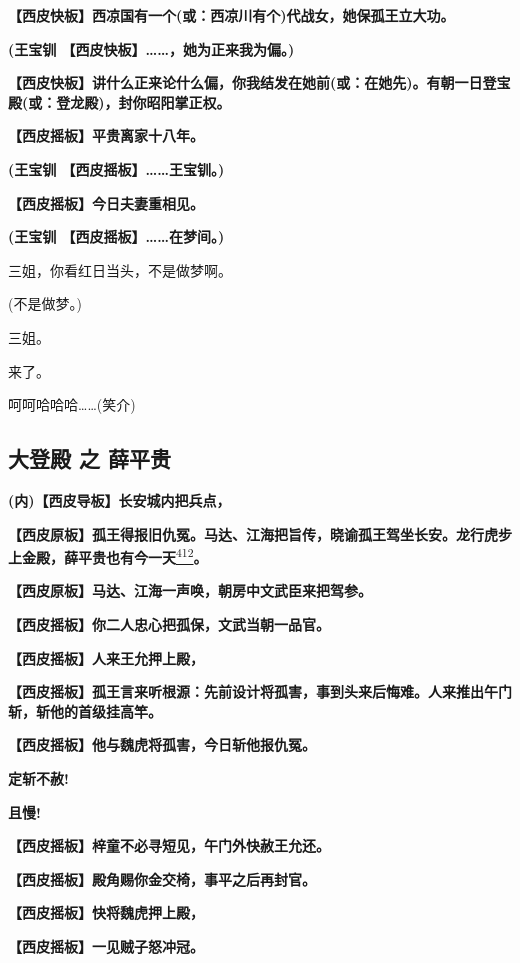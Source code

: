 \textbf{【西皮快板】西凉国有一个(或：西凉川有个)代战女，她保孤王立大功。}

\textbf{(王宝钏 【西皮快板】\ldots{}\ldots{}，她为正来我为偏。)}

\textbf{【西皮快板】讲什么正来论什么偏，你我结发在她前(或：在她先)。有朝一日登宝殿(或：登龙殿)，封你昭阳掌正权。}

\textbf{【西皮摇板】平贵离家十八年。}

\textbf{(王宝钏 【西皮摇板】\ldots{}\ldots{}王宝钏。)}

\textbf{【西皮摇板】今日夫妻重相见。}

\textbf{(王宝钏 【西皮摇板】\ldots{}\ldots{}在梦间。)}

三姐，你看红日当头，不是做梦啊。

(不是做梦。)

三姐。

来了。

呵呵哈哈哈\ldots{}\ldots{}(笑介)

\hypertarget{ux5927ux767bux6bbf-ux4e4b-ux859bux5e73ux8d35}{%
\subsection{大登殿 之
薛平贵}\label{ux5927ux767bux6bbf-ux4e4b-ux859bux5e73ux8d35}}

\textbf{(内)【西皮导板】长安城内把兵点，}

\textbf{【西皮原板】孤王得报旧仇冤。马达、江海把旨传，晓谕孤王驾坐长安。龙行虎步上金殿，薛平贵也有今一天}\protect\hyperlink{fn412}{\textsuperscript{412}}\textbf{。}

\textbf{【西皮原板】马达、江海一声唤，朝房中文武臣来把驾参。}

\textbf{【西皮摇板】你二人忠心把孤保，文武当朝一品官。}

\textbf{【西皮摇板】人来王允押上殿，}

\textbf{【西皮摇板】孤王言来听根源：先前设计将孤害，事到头来后悔难。人来推出午门斩，斩他的首级挂高竿。}

\textbf{【西皮摇板】他与魏虎将孤害，今日斩他报仇冤。}

\textbf{定斩不赦!}

\textbf{且慢!}

\textbf{【西皮摇板】梓童不必寻短见，午门外快赦王允还。}

\textbf{【西皮摇板】殿角赐你金交椅，事平之后再封官。}

\textbf{【西皮摇板】快将魏虎押上殿，}

\textbf{【西皮摇板】一见贼子怒冲冠。}

